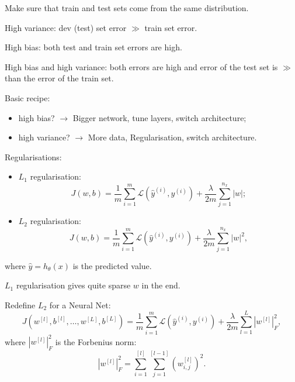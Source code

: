 \documentclass[a4paper,11pt]{article}
\begin{document}
Make sure that train and test sets come from the same distribution.

High variance: dev (test) set error $\gg$ train set error.

High bias: both test and train set errors are high.

High bias and high variance: both errors are high and error of the test set is $\gg$ than the error of the train set.

Basic recipe:
\begin{itemize}
\item high bias? $\rightarrow$ Bigger network, tune layers, switch architecture;
\item high variance? $\rightarrow$ More data, Regularisation, switch architecture.
\end{itemize}

Regularisations:
\begin{itemize}
\item \textcolor{OliveGreen}{$L_1$} regularisation:
\begin{equation}
J \left( w , b \right) = \frac{1}{m} \sum_{i=1} ^m \mathcal{L} \left(\hat{y}^{(i)} , y^{(i)} \right) + \frac{\lambda}{2m} \sum_{j=1} ^{n_x} \left| w \right| ;
\end{equation}
\item \textcolor{OliveGreen}{$L_2$} regularisation:
\begin{equation}
J \left( w , b \right) = \frac{1}{m} \sum_{i=1} ^m \mathcal{L} \left(\hat{y}^{(i)} , y^{(i)} \right) + \frac{\lambda}{2m} \sum_{j=1} ^{n_x} \left| w \right|^2 ,
\end{equation}
\end{itemize}
where \textcolor{OliveGreen}{$\hat{y} = h_\theta \left( x \right)$} is the predicted value.

\textcolor{OliveGreen}{$L_1$} regularisation gives quite sparse \textcolor{OliveGreen}{$w$} in the end.

Redefine \textcolor{OliveGreen}{$L_2$} for a Neural Net:
\begin{equation}
J \left( w^{[l]} , b^{[l]}, \ldots , w^{[L]} , b^{[L]} \right) = \frac{1}{m} \sum_{i=1} ^m \mathcal{L} \left(\hat{y}^{(i)} , y^{(i)} \right) + \frac{\lambda}{2m} \sum_{l=1} ^{L} \left| w^{[l]} \right|^2 _F ,
\end{equation}
where \textcolor{OliveGreen}{$\left| w^{[l]} \right|^2 _F$} is the Forbenius norm:
\begin{equation}
\left| w^{[l]} \right|^2 _F = \sum_{i=1} ^{[l]} \sum_{j=1} ^{[l-1]} \left(w_{i,j} ^{[l]} \right)^2 .
\end{equation}
\end{document}

